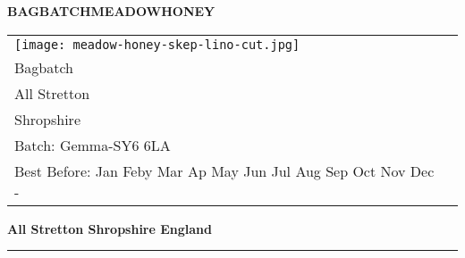 \documentclass[10pt, a4paper]{letter}
\newcommand{\MONTH}{%
  \ifcase\the\month
  \or Jan%
  \or Feby%
  \or Mar%
  \or Ap%
  \or May%
  \or Jun%
  \or Jul%
  \or Aug%
  \or Sep%
  \or Oct%
  \or Nov%
  \or Dec%
  \fi}
\begin{document}

\newcommand\honeylabel{%
{\fontsize{15pt}{20pt}\selectfont  \textbf{BAGBATCH\hfil MEADOW\hfil HONEY}} 
  \begin{tabular}{ll}%
    \begin{minipage}{2cm}%
      \smallskip
      \texttt{[image: meadow-honey-skep-lino-cut.jpg]}
    \end{minipage}%
    \vspace*{2pt}
    &
    \begin{minipage}{4.5cm}
     \par
      454g 1lb \hfill Joe Collins\\
      \footnotesize\strut\hfill Bagbatch\\
      \strut\hfill All Stretton\\
      \strut\hfill  Shropshire\\
      Batch: Gemma-\the\month \hfill SY6 6LA\\
      \AdvanceDate[365]%
      Best Before: \MONTH-\the\year{} \hfill\strut 
    \end{minipage}
  \end{tabular}
{\fontsize{14pt}{20pt}\selectfont  \textbf{All Stretton \hfil Shropshire \hfil England}}
}%

\begin{labels}
%
{%
  \honeylabel
  
}%
\end{labels}

\LeftPageMargin=0mm
\LabelSetup
\setlength{\parskip}{1em}
%
{%
  \rule{\paperwidth}{3pt}\par\par
}%
\end{document}
